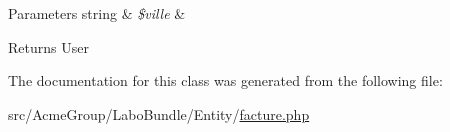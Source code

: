 \begin{DoxyParams}[1]{Parameters}
string & {\em \$ville} & \\
\hline
\end{DoxyParams}
\begin{DoxyReturn}{Returns}
User 
\end{DoxyReturn}


The documentation for this class was generated from the following file\+:\begin{DoxyCompactItemize}
\item 
src/\+Acme\+Group/\+Labo\+Bundle/\+Entity/\hyperlink{_labo_bundle_2_entity_2facture_8php}{facture.\+php}\end{DoxyCompactItemize}
